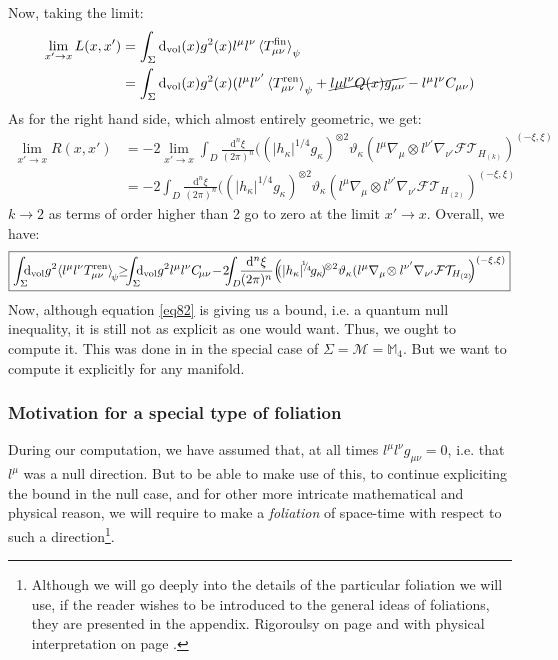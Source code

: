 \documentclass[a4paper,11pt]{article}
\numberwithin{equation}{section}
\theoremstyle{definition}
\renewcommand{\d}{{\mathrm{d}}}
\begin{document}
Now, taking the limit:
\begin{align*}
    \lim_{x'\to x}L(x,x') &= \int_\Sigma \d_\mathrm{vol}(x) g^2(x) l^\mu l^\nu\braket{T^\mathrm{fin}_{\mu\nu}}_\psi\\
    &= \int_\Sigma \d_\mathrm{vol}(x) g^2(x) (l^\mu l^{\nu'}\braket{T^\mathrm{ren}_{\mu\nu}}_\psi+\cancel{l\mu l^\nu Q(x)g_{\mu\nu}}-l^\mu l^\nu C_{\mu\nu})
\end{align*}
As for the right hand side, which almost entirely geometric, we get:
\begin{align*}
    \lim_{x'\to x} R(x,x') &= -2\lim_{x'\to x}\int_D\frac{\d^n\xi}{(2\pi)^n}((|h_\kappa|^{1/4}g_\kappa)^{\otimes 2}\vartheta_\kappa(l^\mu\nabla_\mu\otimes l^{\nu'}\nabla_{\nu'}\mathcal{FT}_{H_{(k)}})^{(-\xi,\xi)}\\
    &=-2\int_D\frac{\d^n\xi}{(2\pi)^n}((|h_\kappa|^{1/4}g_\kappa)^{\otimes 2}\vartheta_\kappa(l^\mu\nabla_\mu\otimes l^{\nu'}\nabla_{\nu'}\mathcal{FT}_{H_{(2)}})^{(-\xi,\xi)}
\end{align*}
$k\to2$ as terms of order higher than 2 go to zero at the limit $x'\to x$. Overall, we have:
\begin{equation}\label{eq82}
    \boxed{\int_\Sigma \!\!\!\d_\mathrm{vol} g^2 \!\braket{l^\mu l^\nu T^\mathrm{ren}_{\mu\nu}}_{\!\psi} \!\!\geq\!\!\! \int_\Sigma \!\!\!\d_\mathrm{vol} g^2l^\mu l^\nu C_{\!\mu\nu}\!-\!2\!\!\!\int_D\!\!\frac{\d^n\xi}{(2\pi)^n}\!\left(\!\!(|h_\kappa|^{\!^1\!\!/_{\!4}}\!g_\kappa\!)^{\!\otimes 2}\vartheta_\kappa(l^\mu\nabla_\mu\!\otimes l^{\nu'}\nabla_{\nu'}\mathcal{FT}_{\!\!H_{(2)}}\!\!\right)^{(-\xi,\xi)}}
\end{equation}
Now, although equation \ref{eq82} is giving us a bound, i.e. a quantum null inequality, it is still not as explicit as one would want. Thus, we ought to compute it. This was done in \cite{DSNEC} in the special case of $\Sigma=\mathcal{M}=\mathbb{M}_4$. But we want to compute it explicitly for any manifold.
\subsubsection{Motivation for a special type of foliation}
During our computation, we have assumed that, at all times $l^\mu l^\nu g_{\mu\nu}=0$, i.e. that $l^\mu$ was a null direction. But to be able to make use of this, to continue expliciting the bound in the null case, and for other more intricate mathematical and physical reason, we will require to make a \emph{foliation} of space-time with respect to such a direction\footnote{Although we will go deeply into the details of the particular foliation we will use, if the reader wishes to be introduced to the general ideas of foliations, they are presented in the appendix. Rigoroulsy on page \pageref{MatFoli} and with physical interpretation on page \pageref{PhyFoli}.}.
\end{document}

